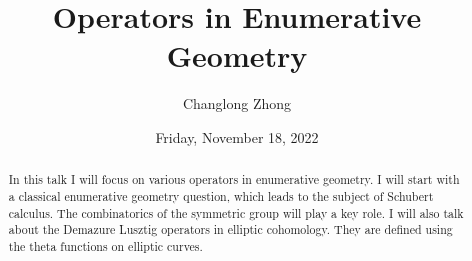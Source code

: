 \documentclass[colloquium]{UAmathtalk}
\author{Changlong Zhong}
\title{Operators in Enumerative Geometry}
\date{Friday, November 18, 2022}
\begin{document}
\maketitle

\begin{abstract}
In this talk I will focus on various operators in enumerative geometry. I will start with a classical enumerative geometry question, which leads to the subject of Schubert calculus. The combinatorics of the symmetric group will play a key role. I will also talk about the Demazure Lusztig operators in elliptic cohomology. They are defined using the theta functions on elliptic curves.
\end{abstract}
\end{document}
